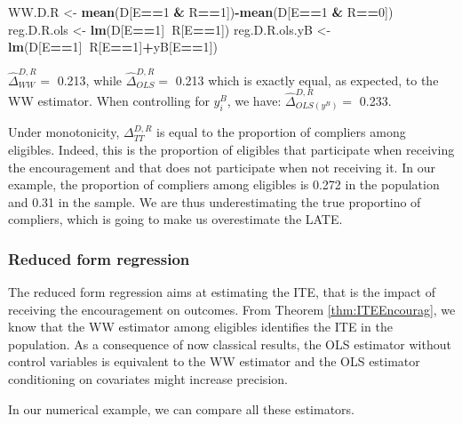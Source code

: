 \documentclass[]{book}
\newenvironment{Shaded}{\begin{snugshade}}{\end{snugshade}}
\newcommand{\KeywordTok}[1]{\textcolor[rgb]{0.13,0.29,0.53}{\textbf{#1}}}
\newcommand{\DecValTok}[1]{\textcolor[rgb]{0.00,0.00,0.81}{#1}}
\newcommand{\StringTok}[1]{\textcolor[rgb]{0.31,0.60,0.02}{#1}}
\newcommand{\OperatorTok}[1]{\textcolor[rgb]{0.81,0.36,0.00}{\textbf{#1}}}
\newcommand{\NormalTok}[1]{#1}
\theoremstyle{definition}
\theoremstyle{definition}
\theoremstyle{definition}
\theoremstyle{remark}
\let\BeginKnitrBlock\begin \let\EndKnitrBlock\end
\begin{document}
\begin{Shaded}
\begin{Highlighting}[]
\NormalTok{WW.D.R <-}\StringTok{ }\KeywordTok{mean}\NormalTok{(D[E}\OperatorTok{==}\DecValTok{1} \OperatorTok{&}\StringTok{ }\NormalTok{R}\OperatorTok{==}\DecValTok{1}\NormalTok{])}\OperatorTok{-}\KeywordTok{mean}\NormalTok{(D[E}\OperatorTok{==}\DecValTok{1} \OperatorTok{&}\StringTok{ }\NormalTok{R}\OperatorTok{==}\DecValTok{0}\NormalTok{])}
\NormalTok{reg.D.R.ols <-}\StringTok{ }\KeywordTok{lm}\NormalTok{(D[E}\OperatorTok{==}\DecValTok{1}\NormalTok{]}\OperatorTok{~}\NormalTok{R[E}\OperatorTok{==}\DecValTok{1}\NormalTok{])}
\NormalTok{reg.D.R.ols.yB <-}\StringTok{ }\KeywordTok{lm}\NormalTok{(D[E}\OperatorTok{==}\DecValTok{1}\NormalTok{]}\OperatorTok{~}\NormalTok{R[E}\OperatorTok{==}\DecValTok{1}\NormalTok{]}\OperatorTok{+}\NormalTok{yB[E}\OperatorTok{==}\DecValTok{1}\NormalTok{])}
\end{Highlighting}
\end{Shaded}

\(\hat{\Delta}^{D,R}_{WW} =\) 0.213, while \(\hat{\Delta}^{D,R}_{OLS}=\)
0.213 which is exactly equal, as expected, to the WW estimator. When
controlling for \(y^B_i\), we have: \(\hat{\Delta}^{D,R}_{OLS(y^B)}=\)
0.233.

Under monotonicity, \(\Delta^{D,R}_{TT}\) is equal to the proportion of
compliers among eligibles. Indeed, this is the proportion of eligibles
that participate when receiving the encouragement and that does not
participate when not receiving it. In our example, the proportion of
compliers among eligibles is 0.272 in the population and 0.31 in the
sample. We are thus underestimating the true proportino of compliers,
which is going to make us overestimate the LATE.

\subsubsection{Reduced form regression}\label{reduced-form-regression}

The reduced form regression aims at estimating the ITE, that is the
impact of receiving the encouragement on outcomes. From Theorem
\ref{thm:ITEEncourag}, we know that the WW estimator among eligibles
identifies the ITE in the population. As a consequence of now classical
results, the OLS estimator without control variables is equivalent to
the WW estimator and the OLS estimator conditioning on covariates might
increase precision.

\BeginKnitrBlock{example}
\protect\hypertarget{exm:unnamed-chunk-120}{}{\label{exm:unnamed-chunk-120}
}In our numerical example, we can compare all these estimators.
\EndKnitrBlock{example}
\end{document}
